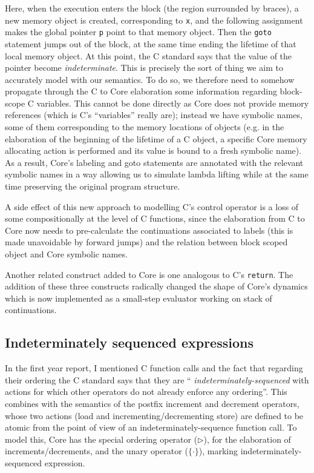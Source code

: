 \documentclass[11pt,a4paper, twocolumn]{article}
\begin{document}
\noindent Here, when the execution enters the block (the region
surrounded by braces), a new memory object is created, corresponding
to \texttt{x}, and the following assignment makes the global pointer
\texttt{p} point to that memory object. Then the \texttt{goto}
statement jumps out of the block, at the same time ending the lifetime
of that local memory object. At this point, the C standard says that
the value of the pointer become {\it indeterminate}. This is precisely
the sort of thing we aim to accurately model with our semantics. To do
so, we therefore need to somehow propagate through the C to Core
elaboration some information regarding block-scope C variables. This
cannot be done directly as Core does not provide memory references
(which is C's ``variables'' really are); instead we have symbolic
names, some of them corresponding to the memory locations of objects
(e.g. in the elaboration of the beginning of the lifetime of a C
object, a specific Core memory allocating action is performed and its
value is bound to a fresh symbolic name). As a result, Core's labeling
and goto statements are annotated with the relevant symbolic names in
a way allowing us to simulate lambda lifting while at the same time
preserving the original program structure.

A side effect of this new approach to modelling C's control operator
is a loss of some compositionally at the level of C functions, since
the elaboration from C to Core now needs to pre-calculate the
continuations associated to labels (this is made unavoidable by
forward jumps) and the relation between block scoped object and Core
symbolic names.

Another related construct added to Core is one analogous to C's
\texttt{return}. The addition of these three constructs radically
changed the shape of Core's dynamics which is now implemented as a
small-step evaluator working on stack of continuations.


\subsection*{Indeterminately sequenced expressions}

In the first year report, I mentioned C function calls and the fact
that regarding their ordering the C standard says that they are ``{\it
  indeterminately-sequenced} with actions for which other operators do
not already enforce any ordering''. This combines with the semantics
of the postfix increment and decrement operators, whose two actions
(load and incrementing/decrementing store) are defined to be atomic
from the point of view of an indeterminately-sequence function
call. To model this, Core has the special ordering operator ($\rhd$),
for the elaboration of increments/decrements, and the unary operator
($\{ \cdot \}$), marking indeterminately-sequenced expression.
\end{document}
